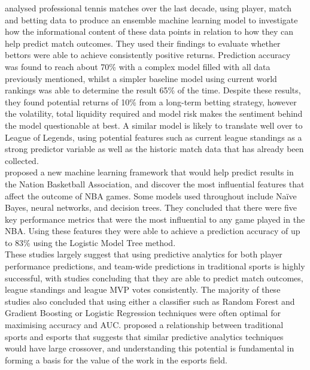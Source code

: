 \citet{wilkens2021sports} analysed professional tennis matches over the last decade, using player, match and betting data to produce an ensemble machine learning model to investigate how the informational content of these data points in relation to how they can help predict match outcomes.
They used their findings to evaluate whether bettors were able to achieve consistently positive returns.
Prediction accuracy was found to reach about 70\% with a complex model filled with all data previously mentioned, whilst a simpler baseline model using current world rankings was able to determine the result 65\% of the time.
Despite these results, they found potential returns of 10\% from a long-term betting strategy, however the volatility, total liquidity required and model risk makes the sentiment behind the model questionable at best.
A similar model is likely to translate well over to League of Legends, using potential features such as current league standings as a strong predictor variable as well as the historic match data that has already been collected. \\

\citet{thabtah2019nba} proposed a new machine learning framework that would help predict results in the Nation Basketball Association, and discover the most influential features that affect the outcome of NBA games.
Some models used throughout include Naïve Bayes, neural networks, and decision trees.
They concluded that there were five key performance metrics that were the most influential to any game played in the NBA\@.
Using these features they were able to achieve a prediction accuracy of up to 83\% using the Logistic Model Tree method. \\

These studies largely suggest that using predictive analytics for both player performance predictions, and team-wide predictions in traditional sports is highly successful, with studies concluding that they are able to predict match outcomes, league standings and league MVP votes consistently.
The majority of these studies also concluded that using either a classifier such as Random Forest and Gradient Boosting or Logistic Regression techniques were often optimal for maximising accuracy and AUC\@.
\citet{scelles2021peculiar} proposed a relationship between traditional sports and esports that suggests that similar predictive analytics techniques would have large crossover, and understanding this potential is fundamental in forming a basis for the value of the work in the esports field.

